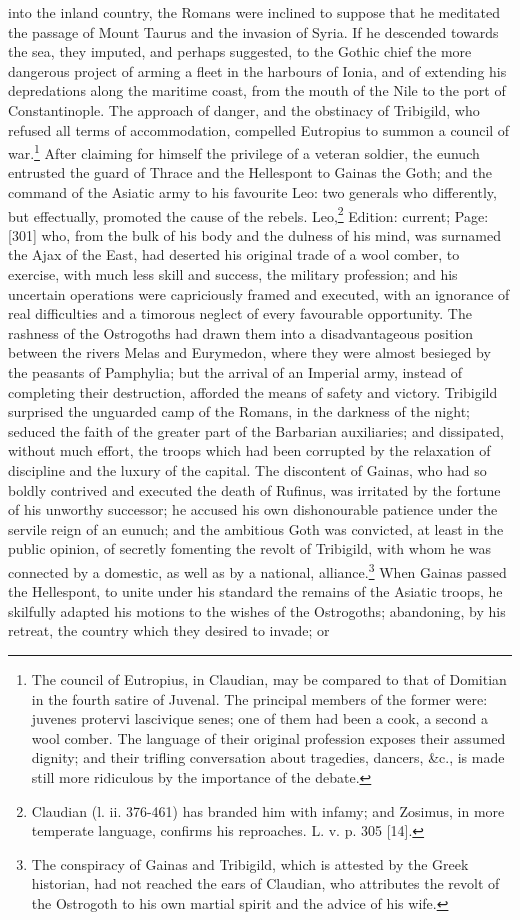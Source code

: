 into the inland country, the Romans were inclined to suppose that he meditated the passage of Mount Taurus and the invasion of Syria. If he descended towards the sea, they imputed, and perhaps suggested, to the Gothic chief the more dangerous project of arming a fleet in the harbours of Ionia, and of extending his depredations along the maritime coast, from the mouth of the Nile to the port of Constantinople. The approach of danger, and the obstinacy of Tribigild, who refused all terms of accommodation, compelled Eutropius to summon a council of war.\footnote{The council of Eutropius, in Claudian, may be compared to that of Domitian in the fourth satire of Juvenal. The principal members of the former were: juvenes protervi lascivique senes; one of them had been a cook, a second a wool comber. The language of their original profession exposes their assumed dignity; and their trifling conversation about tragedies, dancers, \&c., is made still more ridiculous by the importance of the debate.} After claiming for himself the privilege of a veteran soldier, the eunuch entrusted the guard of Thrace and the Hellespont to Gainas the Goth; and the command of the Asiatic army to his favourite Leo: two generals who differently, but effectually, promoted the cause of the rebels. Leo,\footnote{Claudian (l. ii. 376-461) has branded him with infamy; and Zosimus, in more temperate language, confirms his reproaches. L. v. p. 305 [14].} Edition: current; Page: [301] who, from the bulk of his body and the dulness of his mind, was surnamed the Ajax of the East, had deserted his original trade of a wool comber, to exercise, with much less skill and success, the military profession; and his uncertain operations were capriciously framed and executed, with an ignorance of real difficulties and a timorous neglect of every favourable opportunity. The rashness of the Ostrogoths had drawn them into a disadvantageous position between the rivers Melas and Eurymedon, where they were almost besieged by the peasants of Pamphylia; but the arrival of an Imperial army, instead of completing their destruction, afforded the means of safety and victory. Tribigild surprised the unguarded camp of the Romans, in the darkness of the night; seduced the faith of the greater part of the Barbarian auxiliaries; and dissipated, without much effort, the troops which had been corrupted by the relaxation of discipline and the luxury of the capital. The discontent of Gainas, who had so boldly contrived and executed the death of Rufinus, was irritated by the fortune of his unworthy successor; he accused his own dishonourable patience under the servile reign of an eunuch; and the ambitious Goth was convicted, at least in the public opinion, of secretly fomenting the revolt of Tribigild, with whom he was connected by a domestic, as well as by a national, alliance.\footnote{The conspiracy of Gainas and Tribigild, which is attested by the Greek historian, had not reached the ears of Claudian, who attributes the revolt of the Ostrogoth to his own martial spirit and the advice of his wife.} When Gainas passed the Hellespont, to unite under his standard the remains of the Asiatic troops, he skilfully adapted his motions to the wishes of the Ostrogoths; abandoning, by his retreat, the country which they desired to invade; or 